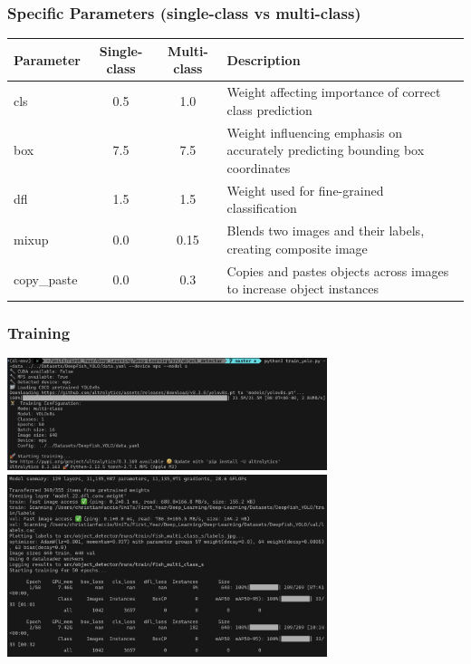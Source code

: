 \documentclass[serif]{beamer}  %
\begin{document}
\begin{frame}
\frametitle{Specific Parameters (single-class vs multi-class)}
\begin{center}
\small
\begin{tabular}{|l|c|c|p{4cm}|}
\hline
	\textbf{Parameter} & \textbf{Single-class} & \textbf{Multi-class} & \textbf{Description} \\
\hline
cls & 0.5 & 1.0 & Weight affecting importance of correct class prediction\\
\hline
box & 7.5 & 7.5 & Weight influencing emphasis on accurately predicting bounding box coordinates\\
\hline
dfl & 1.5 & 1.5 & Weight used for fine-grained classification\\
\hline
mixup & 0.0 & 0.15 & Blends two images and their labels, creating composite image\\
\hline
copy\_paste & 0.0 & 0.3 & Copies and pastes objects across images to increase object instances\\
\hline
\end{tabular}
\end{center}
\end{frame}

\begin{frame}
\frametitle{Training}
\centering
\includegraphics[width=0.7\textwidth]{images/training1.png}
\vspace{0.5cm}
\includegraphics[width=0.7\textwidth]{images/training2.png}
\end{frame}
\end{document}
